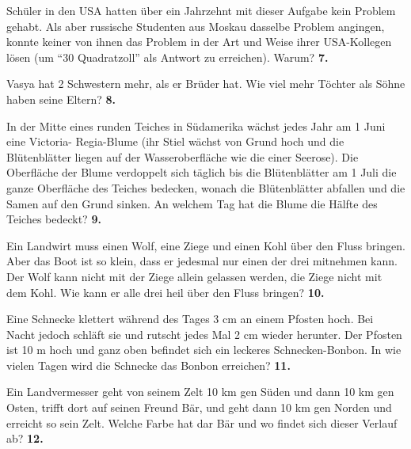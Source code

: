 \documentclass[12pt]{article} %
\begin{document}

Schüler in den USA hatten über ein Jahrzehnt mit dieser Aufgabe kein Problem gehabt. Als aber  russische Studenten aus Moskau dasselbe Problem angingen, konnte keiner von ihnen das Problem in der Art und Weise ihrer USA-Kollegen lösen (um “30 Quadratzoll” als Antwort zu erreichen). Warum?
\newline\newline\quad
{\bf 7.} 

Vasya hat 2 Schwestern mehr, als er Brüder hat. Wie viel mehr Töchter als Söhne haben seine Eltern?
\newline\newline\quad
{\bf 8.} 

In der Mitte eines runden Teiches in Südamerika wächst jedes Jahr am 1 Juni eine Victoria- Regia-Blume (ihr Stiel wächst von Grund hoch und die Blütenblätter liegen auf der Wasseroberfläche wie die einer Seerose). Die Oberfläche der Blume verdoppelt sich täglich bis die Blütenblätter am 1 Juli die ganze Oberfläche des Teiches bedecken, wonach die Blütenblätter abfallen und die Samen auf den Grund sinken. An welchem Tag hat die Blume die Hälfte des Teiches bedeckt? 
\newline\newline\quad
{\bf 9.} 

Ein Landwirt muss einen Wolf, eine Ziege und einen Kohl über den Fluss bringen. Aber das Boot ist so klein, dass er jedesmal nur einen der drei mitnehmen kann. Der Wolf kann nicht mit der Ziege allein gelassen werden, die Ziege nicht mit dem Kohl. Wie kann er alle drei heil über den Fluss bringen? 
\newline\newline\quad
{\bf 10.} 

Eine Schnecke klettert während des Tages 3 cm an einem Pfosten hoch. Bei Nacht jedoch schläft sie und rutscht jedes Mal 2 cm wieder herunter. Der Pfosten ist 10 m hoch und ganz oben befindet sich ein leckeres Schnecken-Bonbon. In wie vielen Tagen wird die Schnecke das Bonbon erreichen?
\newline\newline\quad
{\bf 11.} 

Ein Landvermesser geht von seinem Zelt 10 km gen Süden und dann 10 km gen Osten, trifft dort auf seinen Freund Bär, und geht dann 10 km gen Norden und erreicht so sein Zelt. Welche Farbe hat dar Bär und wo findet sich dieser Verlauf ab?
\newline\newline\quad
{\bf 12.} 
\end{document}
